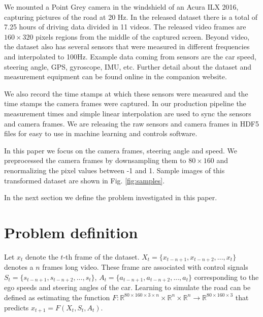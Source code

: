 \documentclass{article} %
\begin{document}
We mounted a Point Grey camera in the windshield of an Acura ILX 2016, capturing pictures of the road at 20 Hz.
In the released dataset there is a total of 7.25 hours of driving data divided in 11 videos. The released video frames are
$160\times 320$ pixels regions from the middle of the captured screen.
Beyond video, the dataset also has several sensors that were measured in different frequencies and interpolated to 100Hz.
Example data coming from sensors are the car speed, steering angle,
GPS, gyroscope, IMU, etc. Further detail about the dataset and measurement equipment can be found online in the companion website.

We also record the time stamps at which these sensors were measured and the time stamps the camera frames were
captured. In our production pipeline the measurement times and simple linear interpolation are used to sync the sensors and camera frames.
We are releasing the raw sensors and camera frames in HDF5 files for easy to use in machine learning and controls software.

In this paper we focus on the camera frames, steering angle and speed.
We preprocessed the camera frames by downsampling them to $ 80\times 160 $ and renormalizing the pixel values
between -1 and 1.
Sample images of this transformed dataset are shown in Fig. \ref{fig:samples}.

In the next section we define the problem investigated in this paper.

\section{Problem definition}
Let $x_t$ denote the $t$-th frame of the dataset. $X_t = \{x_{t-n+1}, x_{t-n+2}, ..., x_{t}\}$ denotes a $n$ frames long video.
These frame are associated with control signals $S_t = \{s_{t-n+1}, s_{t-n+2}, ..., s_{t}\}$, $A_t = \{a_{t-n+1}, a_{t-n+2}, ..., a_{t}\}$
corresponding to the ego speeds and steering angles of the car. Learning to simulate the road can be defined as estimating
the function $F : \mathbb{R}^{80\times 160\times 3 \times n} \times \mathbb{R}^n \times \mathbb{R}^n \rightarrow \mathbb{R}^{80\times 160\times 3}$ that
predicts $x_{t+1} = F(X_t, S_t, A_t)$.
\end{document}
